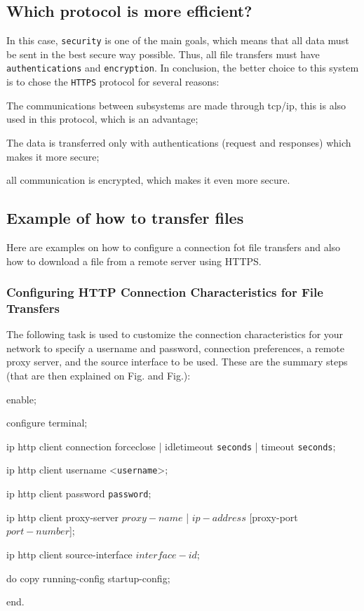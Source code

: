 \subsection{Which protocol is more efficient?}
\label{sub-sec:prot-effic}

In this case, \texttt{security} is one of the main goals, which means that all data must be sent in the best secure way possible. Thus, all file transfers must have \texttt{authentications} and \texttt{encryption}.
%
In conclusion, the better choice to this system is to chose the \texttt{HTTPS} protocol for several reasons:
\begin{item-c}
\item The communications between subsystems are made through \gls{tcp}/\gls{ip}, this is also used in this protocol, which is an advantage;
\item The data is transferred only with authentications (request and responses) which makes it more secure;
\item all communication is encrypted, which makes it even more secure.
\end{item-c} 

\subsection{Example of how to transfer files}
\label{sub-sec:file-transf-ex}

Here are examples on how to configure a connection fot file transfers and also how to download a file from a remote server using HTTPS.

\subsubsection{Configuring HTTP Connection Characteristics for File Transfers}
The following task is used to customize the connection characteristics for your network to specify a username and password, connection preferences, a remote proxy server, and the source interface to be used. These are the summary steps (that are then explained on Fig. and Fig.):

\begin{enum-c}
\item enable;
\item configure terminal;
\item ip http client connection {forceclose | idletimeout \texttt{seconds} | timeout \texttt{seconds}};
\item ip http client username <\texttt{username}>;
\item ip http client password \texttt{password};
\item ip http client proxy-server {$proxy-name$ | $ip-address$} [proxy-port $port-number$];
\item ip http client source-interface $interface-id$;
\item do copy running-config startup-config;
\item end.
\end{enum-c}


